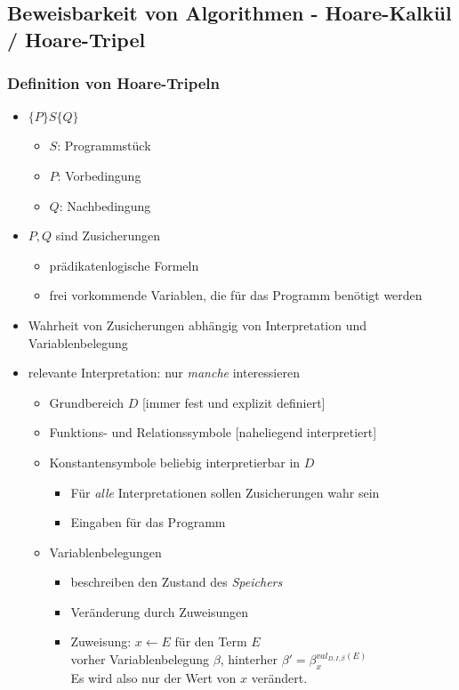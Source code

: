\documentclass{article}
\newcommand{\important}[1]{\textcolor{importantColor}{#1}}
\newcommand{\set}[1]{\{#1\}}
\newcommand{\anfuehrung}[1]{\flqq #1\frqq}
\begin{document}
\subsection{Beweisbarkeit von Algorithmen -  Hoare-Kalkül / Hoare-Tripel}
\subsubsection{Definition von Hoare-Tripeln}
\begin{itemize}
    \item \important{$\set{P}S\set{Q}$}
    \begin{itemize}
        \item $S$: Programmstück
        \item $P$: \important{Vorbedingung}
        \item $Q$: \important{Nachbedingung}
    \end{itemize}
    \item $P, Q$ sind \important{Zusicherungen}
    \begin{itemize}
        \item prädikatenlogische Formeln
        \item frei vorkommende Variablen, die für das Programm benötigt werden
    \end{itemize}
    \item Wahrheit von Zusicherungen abhängig von Interpretation und Variablenbelegung
    \item \important{\anfuehrung{relevante} Interpretation}: nur \textit{manche} interessieren
    \begin{itemize}
        \item \important{Grundbereich} $D$ [immer fest und explizit definiert]
        \item \important{Funktions-} und \important{Relationssymbole} [naheliegend interpretiert]
        \item \important{Konstantensymbole} beliebig interpretierbar in $D$
        \begin{itemize}
            \item Für \textit{alle} Interpretationen sollen Zusicherungen wahr sein
            \item \anfuehrung{Eingaben} für das Programm
        \end{itemize}
        \item \important{Variablenbelegungen}
        \begin{itemize}
            \item beschreiben den Zustand des \textit{Speichers}
            \item Veränderung durch Zuweisungen
            \item Zuweisung: $x \leftarrow E$ für den Term $E$\\
            vorher Variablenbelegung $\beta$, hinterher $\beta' = \beta^{val_{D,I,\beta}(E)}_x$\\
            Es wird also nur der Wert von $x$ verändert.
        \end{itemize}
    \end{itemize}
\end{itemize}
\end{document}
